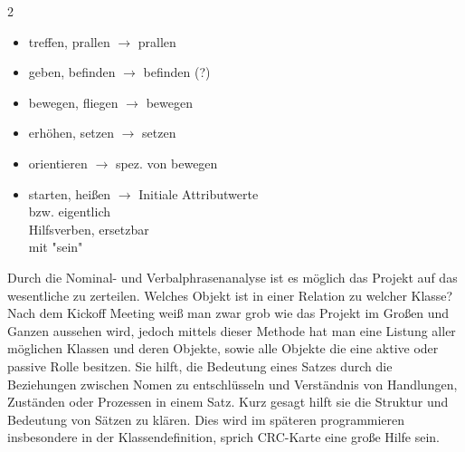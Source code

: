 \documentclass[a4paper,12pt]{article}
\begin{document}
\begin{multicols}{2}
\begin{itemize}[label={},leftmargin=0pt,itemindent=0pt]
    \item \hspace*{0.5cm} treffen, prallen $\rightarrow$ prallen
    \item \hspace*{0.5cm} geben, befinden $\rightarrow$ befinden (?)
    \item \hspace*{0.5cm} bewegen, fliegen $\rightarrow$ bewegen
    \item \hspace*{0.5cm} erhöhen, setzen $\rightarrow$ setzen
\end{itemize}
\columnbreak
\begin{itemize}[label={},leftmargin=0pt,itemindent=0pt]
    \item orientieren $\rightarrow$ spez. von bewegen
    \item \parbox[t]{\linewidth}{
            starten, heißen $\rightarrow$ Initiale Attributwerte \\
            \hspace*{3.25cm} bzw. eigentlich \\
            \hspace*{3.25cm} Hilfsverben, ersetzbar \\
            \hspace*{3.25cm} mit "sein"
          }
\end{itemize}
\end{multicols}
\clearpage
Durch die Nominal- und Verbalphrasenanalyse ist es möglich das Projekt auf das wesentliche zu zerteilen. Welches Objekt ist in einer Relation zu welcher Klasse? Nach dem Kickoff Meeting weiß man zwar grob wie das Projekt im Großen und Ganzen aussehen wird, jedoch mittels dieser Methode hat man eine Listung aller möglichen Klassen und deren Objekte, sowie alle Objekte die eine aktive oder passive Rolle besitzen. Sie hilft, die Bedeutung eines Satzes durch die Beziehungen zwischen Nomen zu entschlüsseln und Verständnis von Handlungen, Zuständen oder Prozessen in einem Satz. Kurz gesagt hilft sie die Struktur und Bedeutung von Sätzen zu klären. Dies wird im späteren programmieren insbesondere in der Klassendefinition, sprich CRC-Karte eine große Hilfe sein.
\end{document}
